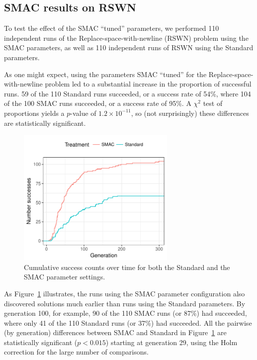 \subsection{SMAC results on RSWN}
\label{sec:SMACresultsRSWN}


To test the effect of the SMAC ``tuned'' parameters, we performed 110
independent runs of the Replace-space-with-newline (RSWN) problem using the
SMAC parameters, as well as 110 independent runs of RSWN using the
Standard parameters.

As one might expect, using the parameters SMAC ``tuned'' for the
Replace-space-with-newline problem led to a 
substantial increase in the proportion of successful runs. 59 of 
the 110 Standard runs succeeded, or a success rate of 54\%, where 104 of the
100 SMAC runs succeeded, or a success rate of 95\%. A $\chi^2$ test of 
proportions yields a $p$-value of $1.2 \times 10^{-11}$, so (not surprisingly)
these differences are statistically significant.

\begin{figure}
	\includegraphics[width=3in]{../figures/successGenerations}
	\caption{Cumulative success counts over time for both the Standard
	and the SMAC parameter settings.}
	\label{fig:successGenerations}
\end{figure}

As Figure~\ref{fig:successGenerations} illustrates, the runs using the SMAC
parameter configuration also discovered solutions much earlier than runs using
the Standard parameters. By generation 100, for example, 90 of the 110 SMAC 
runs (or 87\%) had succeeded, where only 41 of the 110 Standard runs 
(or 37\%) had succeeded. All the pairwise (by generation) differences 
between SMAC and Standard in Figure~\ref{fig:successGenerations} are 
statistically significant ($p<0.015$)
starting at generation 29, using the Holm correction for the large number of
comparisons.

